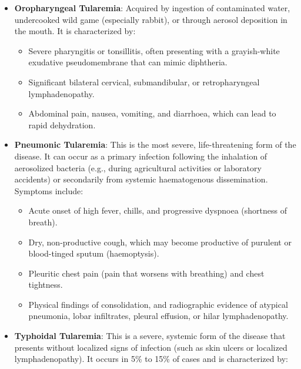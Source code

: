 \begin{itemize}
\begin{itemize}
        \item Multiple small, yellowish conjunctival nodules or shallow ulcers.
        \item Exquisite tenderness and swelling of the preauricular, submandibular, and cervical lymph nodes on the affected side.
        \item Photophobia (light sensitivity) and watery or purulent discharge from the eye.
    \end{itemize}
    \item \textbf{Oropharyngeal Tularemia}: Acquired by ingestion of contaminated water, undercooked wild game (especially rabbit), or through aerosol deposition in the mouth. It is characterized by:
    \begin{itemize}
        \item Severe pharyngitis or tonsillitis, often presenting with a grayish-white exudative pseudomembrane that can mimic diphtheria.
        \item Significant bilateral cervical, submandibular, or retropharyngeal lymphadenopathy.
        \item Abdominal pain, nausea, vomiting, and diarrhoea, which can lead to rapid dehydration.
    \end{itemize}
    \item \textbf{Pneumonic Tularemia}: This is the most severe, life-threatening form of the disease. It can occur as a primary infection following the inhalation of aerosolized bacteria (e.g., during agricultural activities or laboratory accidents) or secondarily from systemic haematogenous dissemination. Symptoms include:
    \begin{itemize}
        \item Acute onset of high fever, chills, and progressive dyspnoea (shortness of breath).
        \item Dry, non-productive cough, which may become productive of purulent or blood-tinged sputum (haemoptysis).
        \item Pleuritic chest pain (pain that worsens with breathing) and chest tightness.
        \item Physical findings of consolidation, and radiographic evidence of atypical pneumonia, lobar infiltrates, pleural effusion, or hilar lymphadenopathy.
    \end{itemize}
    \item \textbf{Typhoidal Tularemia}: This is a severe, systemic form of the disease that presents without localized signs of infection (such as skin ulcers or localized lymphadenopathy). It occurs in 5\% to 15\% of cases and is characterized by:

\end{itemize}
